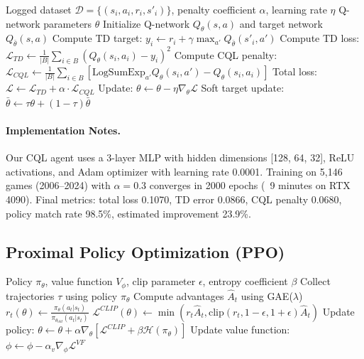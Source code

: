 \begin{algorithm}[H]
\caption{Conservative Q-Learning (CQL)}
\begin{algorithmic}[1]
\Require Logged dataset $\mathcal{D} = \{(s_i, a_i, r_i, s'_i)\}$, penalty coefficient $\alpha$, learning rate $\eta$
\Ensure Q-network parameters $\theta$
\State Initialize Q-network $Q_\theta(s,a)$ and target network $Q_{\bar\theta}(s,a)$
    \State Compute TD target: $y_i \gets r_i + \gamma \max_{a'} Q_{\bar\theta}(s'_i, a')$
    \State Compute TD loss: $\mathcal{L}_{TD} \gets \frac{1}{|B|} \sum_{i \in B} (Q_\theta(s_i, a_i) - y_i)^2$
    \State Compute CQL penalty: $\mathcal{L}_{CQL} \gets \frac{1}{|B|} \sum_{i \in B} \left[\text{LogSumExp}_{a'} Q_\theta(s_i, a') - Q_\theta(s_i, a_i)\right]$
    \State Total loss: $\mathcal{L} \gets \mathcal{L}_{TD} + \alpha \cdot \mathcal{L}_{CQL}$
    \State Update: $\theta \gets \theta - \eta \nabla_\theta \mathcal{L}$
  \EndFor
  \State Soft target update: $\bar\theta \gets \tau \theta + (1 - \tau) \bar\theta$
\EndFor
\end{algorithmic}
\end{algorithm}

\paragraph{Implementation Notes.}
Our CQL agent uses a 3-layer MLP with hidden dimensions [128, 64, 32], ReLU activations, and Adam optimizer with learning rate 0.0001. Training on 5,146 games (2006--2024) with $\alpha=0.3$ converges in 2000 epochs (~9 minutes on RTX 4090). Final metrics: total loss 0.1070, TD error 0.0866, CQL penalty 0.0680, policy match rate 98.5\%, estimated improvement 23.9\%.

\subsection{Proximal Policy Optimization (PPO)}
\begin{algorithm}[H]
\caption{Proximal Policy Optimization (PPO)}
\begin{algorithmic}[1]
\Require Policy $\pi_\theta$, value function $V_\phi$, clip parameter $\epsilon$, entropy coefficient $\beta$
  \State Collect trajectories $\tau$ using policy $\pi_\theta$
  \State Compute advantages $\hat{A}_t$ using GAE($\lambda$)
      \State $r_t(\theta) \gets \frac{\pi_\theta(a_t|s_t)}{\pi_{\theta_{old}}(a_t|s_t)}$
      \State $\mathcal{L}^{CLIP}(\theta) \gets \min(r_t \hat{A}_t, \text{clip}(r_t, 1-\epsilon, 1+\epsilon) \hat{A}_t)$
      \State Update policy: $\theta \gets \theta + \alpha \nabla_\theta [\mathcal{L}^{CLIP} + \beta \mathcal{H}(\pi_\theta)]$
    \EndFor
  \EndFor
  \State Update value function: $\phi \gets \phi - \alpha_v \nabla_\phi \mathcal{L}^{VF}$
\EndFor
\end{algorithmic}
\end{algorithm}

